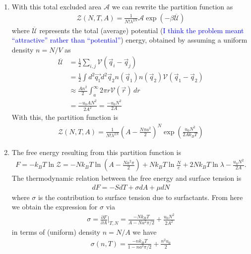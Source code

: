 \documentclass{article}
\theoremstyle{definition}
\newcommand{\p}{\partial}
\newcommand{\be}{\beta}
\newcommand{\f}[2]{\frac{#1}{#2}}
\newcommand{\lp}{\left(}
\newcommand{\rp}{\right)}
\begin{document}
\begin{enumerate}[label=(\alph*)]
	
	\item With this total excluded area $\mathcal{A}$ we can rewrite the partition function as 
	\begin{align*}
	\mathcal{Z}(N,T,A) = \f{1}{N! \lambda^{2N}} \mathcal{A} \exp(-\be \overline{\mathcal{U}})
	\end{align*}
	where $\overline{\mathcal{U}}$ represents the total (average) potential (\textcolor{blue}{I think the problem meant ``attractive'' rather than ``potential''}) energy, obtained by assuming a uniform density $n=N/V$ as
	\begin{align*}
	\overline{\mathcal{U}} &= \f{1}{2} \sum_{i,j} \mathcal{V}(\vec{q}_i - \vec{q}_j) \\
	&= \f{1}{2} \int d^2 \vec{q_1} d^2 \vec{q}_2 n(\vec{q}_1) n(\vec{q}_2) \mathcal{V}(\vec{q}_1 - \vec{q}_2) \\
	&\approx \f{ A n^2}{2} \int_a^\infty  2\pi r   \mathcal{V}(\vec{r})\,dr \\
	&= \f{- u_0 AN^2}{2 A^2} = \boxed{\f{- u_0 N^2}{2A}}
	\end{align*} 
	With this, the partition function is 
	\begin{align*}
	\boxed{\mathcal{Z}(N,T,A) = \f{1}{N! \lambda^{2N}} \lp A - \f{N \pi a^2}{2}\rp^N \exp\lp \f{u_0 N^2}{2A k_BT} \rp}
	\end{align*}
	
	
	\item The free energy resulting from this partition function is 
	\begin{align*}
	F = -k_B T \ln \mathcal{Z} = - N k_BT \ln \lp A - \f{N a^2 \pi}{2} \rp + N k_B T \ln \f{N}{e} + 2N k_B T \ln \lambda - \f{u_0 N^2}{2A}.
	\end{align*}
	The thermodynamic relation between the free energy and surface tension is 
	\begin{align*}
	d F = -S d T + \sigma d A + \mu dN 
	\end{align*}
	where $\sigma$ is the contribution to surface tension due to surfactants. From here we obtain the expression for $\sigma$ via
	\begin{align*}
	\sigma = \f{\p F}{\p A}\bigg\vert_{T,N} = {\f{-N k_BT}{A - N a^2 \pi/2} + \f{u_0 N^2}{2A^2}}
	\end{align*}
	in terms of (uniform) density $n = N/A$ we have
	\begin{align*}
	\boxed{\sigma(n,T) = \f{-n k_B T}{1 - n a^2 \pi/2} + \f{n^2 u_0}{2} }
	\end{align*}
	
	
	

\end{enumerate}
\end{document}
